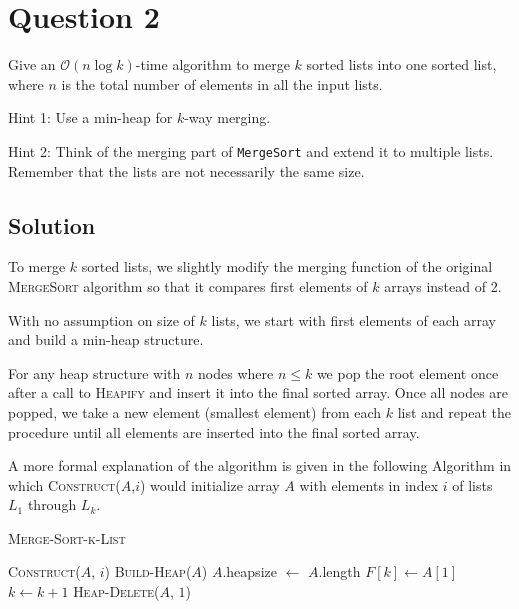 
\section*{Question 2}

Give an $\mathcal{O}(n \log k)$-time algorithm to merge $k$ sorted lists into one sorted list, where $n$ is the total number of elements in all the input lists.

Hint 1: Use a min-heap for $k$-way merging.

Hint 2: Think of the merging part of \texttt{MergeSort} and extend it to multiple lists.
Remember that the lists are not necessarily the same size.

\subsection*{Solution}

To merge $k$ sorted lists, we slightly modify the merging function of the original \textsc{MergeSort} algorithm so that it compares first elements of $k$ arrays instead of 2.

With no assumption on size of $k$ lists, we start with first elements of each array and build a min-heap structure.

For any heap structure with $n$ nodes where $n \leq k$ we pop the root element once after a call to \textsc{Heapify} and insert it into the final sorted array.
Once all nodes are popped, we take a new element (smallest element) from each $k$ list and repeat the procedure until all elements are inserted into the final sorted array.

A more formal explanation of the algorithm is given in the following Algorithm in which \textsc{Construct}($A$,$i$) would initialize array $A$ with elements in index $i$ of lists $L_1$ through $L_k$.

\begin{algorithm}[H]
\caption{\textsc{Merge-Sort-k-List}}
\begin{algorithmic}[1]
\State \textsc{Construct}($A$, $i$)
\State \textsc{Build-Heap}($A$)
\State $A$.heapsize $\leftarrow$ $A$.length
\State $F[k] \leftarrow A[1]$
\State $k \leftarrow k + 1$
\State \textsc{Heap-Delete}($A$, $1$)
\EndFor
\EndFor
\end{algorithmic}
\end{algorithm}

